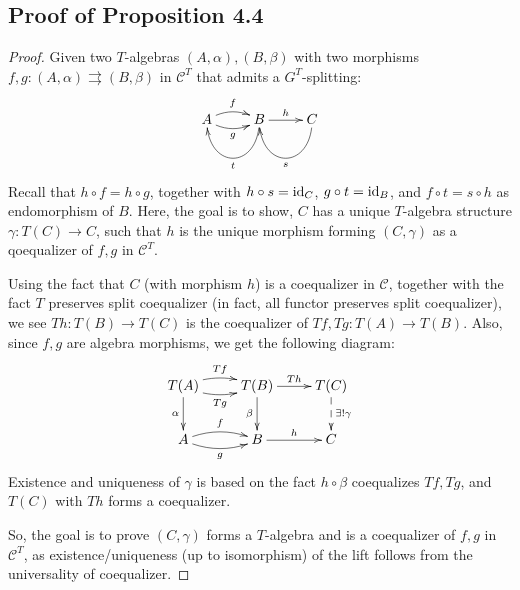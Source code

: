 \documentclass{article}
\begin{document}
\hfil

\subsection{Proof of Proposition 4.4}\label{prop4_4}
\begin{proof}
    Given two $T$-algebras $(A,\alpha),(B,\beta)$ with two morphisms $f,g:(A,\alpha)\rightrightarrows(B,\beta)$ in $\mathcal{C}^T$ that admits a $G^T$-splitting:
    \[\xymatrix{
            A \ar@/_{-.5pc}/[r]^-{f} \ar@/_{.5pc}/[r]_-{g} & B \ar@(d,d)[l]^-{t} \ar[r]^-{h} & C \ar@(d,d)[l]^-{s}
        }\]
    Recall that $h\circ f=h\circ g$, together with $h\circ s=\mathrm{id}_C$, $g\circ t=\mathrm{id}_B$, and $f\circ t=s\circ h$ as endomorphism of $B$. Here, the goal is to show, $C$ has a unique $T$-algebra structure $\gamma:T(C)\rightarrow C$, such that $h$ is the unique morphism forming $(C,\gamma)$ as a qoequalizer of $f,g$ in $\mathcal{C}^T$.
    
    Using the fact that $C$ (with morphism $h$) is a coequalizer in $\mathcal{C}$, together with the fact $T$ preserves split coequalizer (in fact, all functor preserves split coequalizer), we see $Th:T(B)\rightarrow T(C)$ is the coequalizer of $Tf,Tg:T(A)\rightarrow T(B)$. Also, since $f,g$ are algebra morphisms, we get the following diagram:
    \[\xymatrix{
        T(A) \ar[d]_-{\alpha} \ar@/_{-.5pc}/[r]^-{Tf} \ar@/_{.5pc}/[r]_-{Tg} & T(B) \ar[d]_-{\beta} \ar[r]^-{Th} & T(C) \ar@{-->}[d]^-{\exists ! \gamma} \\
        A \ar@/_{-.5pc}/[r]^-{f} \ar@/_{.5pc}/[r]_-{g} & B \ar[r]^-{h} & C 
        }\]
        Existence and uniqueness of $\gamma$ is based on the fact $h\circ \beta$ coequalizes $Tf,Tg$, and $T(C)$ with $Th$ forms a coequalizer.

        \hfil

        So, the goal is to prove $(C,\gamma)$ forms a $T$-algebra and is a coequalizer of $f,g$ in $\mathcal{C}^T$, as existence/uniqueness (up to isomorphism) of the lift follows from the universality of coequalizer.


\end{proof}
\end{document}
